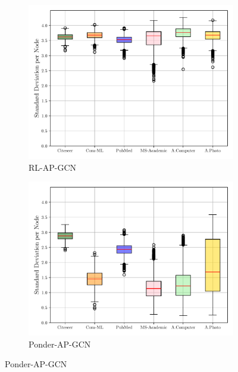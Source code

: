 \documentclass{gdl}
\begin{document}
\begin{figure}[p]
\begin{minipage}[t]{0.48\textwidth}
        \begin{subfigure}[b]{0.8\textwidth}
            \centering
            \includegraphics[width=\textwidth]{RL-AP-GCN_std_steps_per_node_boxplot.pdf}
            \captionsetup{justification=centerlast}
            \caption{RL-AP-GCN}
            \label{fig:step_std_RL_AP_GCN}
        \end{subfigure}
        
        \begin{subfigure}[b]{0.8\textwidth}
            \centering
            \includegraphics[width=\textwidth]{Ponder-AP-GCN_std_steps_per_node_boxplot.pdf}
            \captionsetup{justification=centerlast}
            \caption{Ponder-AP-GCN}
            \label{fig:step_std_Ponder_AP_GCN}
        \end{subfigure}
        

\end{minipage}
\end{figure}
\end{document}
